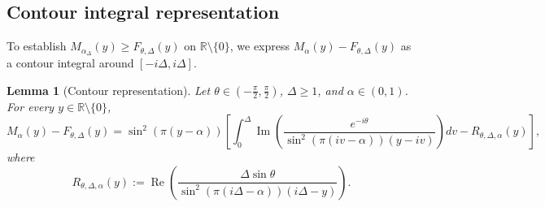 \documentclass[11pt,a4paper]{amsart}
\newtheorem{lemma}[theorem]{Lemma}
\theoremstyle{remark}
\numberwithin{equation}{section}
\newcommand{\R}{\mathbb{R}}
\begin{document}
\subsection{Contour integral representation}
To establish $M_{\alpha_\Delta}(y) \ge F_{\theta,\Delta}(y)$ on $\R\setminus\{0\}$, we express $M_\alpha(y) - F_{\theta,\Delta}(y)$ as a contour integral around $[-i\Delta, i\Delta]$.

\begin{lemma}[Contour representation]\label{lem:contour}
Let $\theta \in (-\frac{\pi}{2},\frac{\pi}{2})$, $\Delta \ge 1$, and $\alpha \in (0,1)$. For every $y \in \R\setminus\{0\}$,
\begin{equation}\label{eq:contour_rep}
  M_\alpha(y) - F_{\theta,\Delta}(y) = \sin^2(\pi(y-\alpha))\left[\int_0^\Delta \operatorname{Im}\!\left(\frac{e^{-i\theta}}{\sin^2(\pi(iv-\alpha))(y-iv)}\right)dv - R_{\theta,\Delta,\alpha}(y)\right],
\end{equation}
where
\[
  R_{\theta,\Delta,\alpha}(y) := \operatorname{Re}\!\left(\frac{\Delta\sin\theta}{\sin^2(\pi(i\Delta-\alpha))(i\Delta-y)}\right).
\]
\end{lemma}
\end{document}
